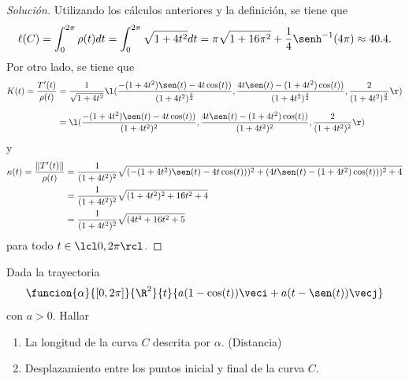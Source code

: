 \documentclass[a4,11pt]{aleph-notas}
\begin{document}
\begin{proof}[Solución]
Utilizando los cálculos anteriores y la definición, se tiene que
	\[
		\ell(C)=\int_0^{2\pi}\rho(t)dt=\int_0^{2\pi}\sqrt{1 + 4t^2}dt=
		\pi \sqrt{1 + 16 \pi^2} + \dfrac{1}{4} \senh^{-1}(4\pi)\approx 40.4.
	\]
	Por otro lado, se tiene que
	\begin{align*}
		K(t)=\dfrac{T'(t)}{\rho(t)}
		&=\dfrac{1}{\sqrt{1+4t^2}}\l(\dfrac{-(1+4t^2) \sen(t) -4t\cos(t))}{(1 + 4 t^2)^\frac{3}{2}},
		\dfrac{ 4t\sen(t)-(1+4t^2) \cos(t))}{(1 + 4 t^2)^\frac{3}{2}},
		\dfrac{ 2}{(1 + 4 t^2)^\frac{3}{2}}\r)\\[2mm]
		&=\l(\dfrac{-(1+4t^2) \sen(t) -4t\cos(t))}{(1 + 4 t^2)^2},
		\dfrac{ 4t\sen(t)-(1+4t^2) \cos(t))}{(1 + 4 t^2)^2},
		\dfrac{ 2}{(1 + 4 t^2)^2}\r)
	\end{align*}
	y
	\begin{align*}
		\kappa(t)=\dfrac{\|T'(t)\|}{\rho(t)}
		&=\dfrac{1}{(1+4t^2)^2}
		\sqrt{(-(1+4t^2) \sen(t) -4t\cos(t)))^2
				+(4t\sen(t)-(1+4t^2) \cos(t)))^2
				+4}\\
		&=\dfrac{1}{(1+4t^2)^2}
			\sqrt{
			(1+4t^2)^2 +16t^2+4}\\
		&=\dfrac{1}{(1+4t^2)^2}
			\sqrt{
				(4 t^4 + 16 t^2 + 5}
	\end{align*}
	para todo $t\in\lcl0,2\pi\rcl$.
\end{proof}

\begin{ejer}
Dada la trayectoria 
 	\[
        \funcion{\alpha}{\left[0,2\pi \right]}{\R^2}{t}{a(1-\cos (t)) \veci+a(t-\sen (t)) \vecj}
    \]
	con $a>0$. Hallar 
	\begin{enumerate}
	    \item La longitud de la curva $C$ descrita por $\alpha$. (Distancia) 
	    \item Desplazamiento entre los puntos inicial y final de la curva $C$.
	\end{enumerate}
\end{ejer}
\end{document}
